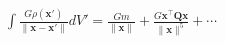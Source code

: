 \documentclass[preview]{standalone}
\begin{document}
\begin{align*}
\int\frac{G\rho(\mathbf x')}{\|\mathbf x-\mathbf x'\|} dV' = \frac{Gm}{\|\mathbf x\|} + \frac{G\mathbf x^\top\mathbf Q\mathbf x}{\|\mathbf x\|^5} +\cdots
\end{align*}
\end{document}
